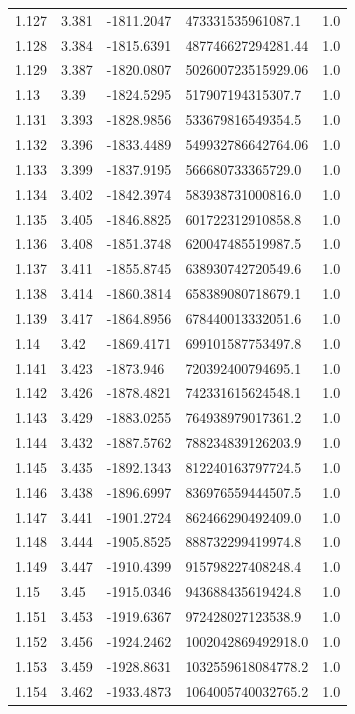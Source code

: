 \begin{tabular}{lllll}
1.127 & 3.381 & -1811.2047 & 473331535961087.1 & 1.0 \\
1.128 & 3.384 & -1815.6391 & 487746627294281.44 & 1.0 \\
1.129 & 3.387 & -1820.0807 & 502600723515929.06 & 1.0 \\
1.13 & 3.39 & -1824.5295 & 517907194315307.7 & 1.0 \\
1.131 & 3.393 & -1828.9856 & 533679816549354.5 & 1.0 \\
1.132 & 3.396 & -1833.4489 & 549932786642764.06 & 1.0 \\
1.133 & 3.399 & -1837.9195 & 566680733365729.0 & 1.0 \\
1.134 & 3.402 & -1842.3974 & 583938731000816.0 & 1.0 \\
1.135 & 3.405 & -1846.8825 & 601722312910858.8 & 1.0 \\
1.136 & 3.408 & -1851.3748 & 620047485519987.5 & 1.0 \\
1.137 & 3.411 & -1855.8745 & 638930742720549.6 & 1.0 \\
1.138 & 3.414 & -1860.3814 & 658389080718679.1 & 1.0 \\
1.139 & 3.417 & -1864.8956 & 678440013332051.6 & 1.0 \\
1.14 & 3.42 & -1869.4171 & 699101587753497.8 & 1.0 \\
1.141 & 3.423 & -1873.946 & 720392400794695.1 & 1.0 \\
1.142 & 3.426 & -1878.4821 & 742331615624548.1 & 1.0 \\
1.143 & 3.429 & -1883.0255 & 764938979017361.2 & 1.0 \\
1.144 & 3.432 & -1887.5762 & 788234839126203.9 & 1.0 \\
1.145 & 3.435 & -1892.1343 & 812240163797724.5 & 1.0 \\
1.146 & 3.438 & -1896.6997 & 836976559444507.5 & 1.0 \\
1.147 & 3.441 & -1901.2724 & 862466290492409.0 & 1.0 \\
1.148 & 3.444 & -1905.8525 & 888732299419974.8 & 1.0 \\
1.149 & 3.447 & -1910.4399 & 915798227408248.4 & 1.0 \\
1.15 & 3.45 & -1915.0346 & 943688435619424.8 & 1.0 \\
1.151 & 3.453 & -1919.6367 & 972428027123538.9 & 1.0 \\
1.152 & 3.456 & -1924.2462 & 1002042869492918.0 & 1.0 \\
1.153 & 3.459 & -1928.8631 & 1032559618084778.2 & 1.0 \\
1.154 & 3.462 & -1933.4873 & 1064005740032765.2 & 1.0 \\

\end{tabular}
